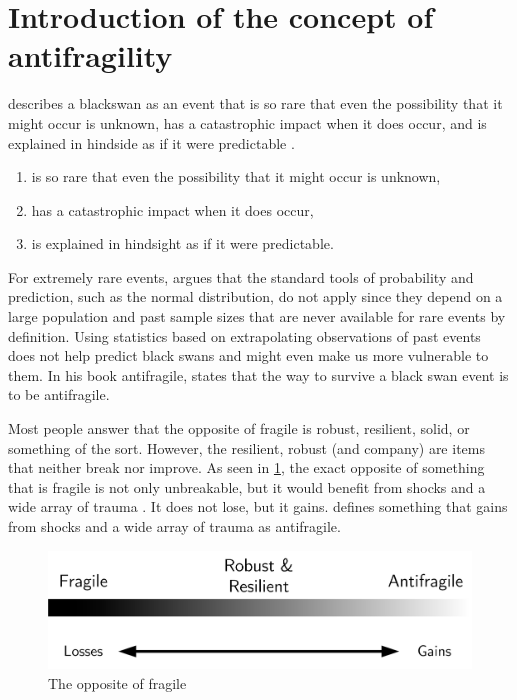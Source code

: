 \section{Introduction of the concept of antifragility}
\label{sec:introantifragility}
\textcite{Taleb2008} describes a \gls{blackswan} as an event that is so rare that even the possibility that it might occur is unknown, has a catastrophic impact when it does occur, and is explained in hindside as if it were predictable \parencite[p.~4]{Taleb2012}.
\begin{enumerate}
	\item{is so rare that even the possibility that it might occur is unknown,}
	\item{has a catastrophic impact when it does occur,}
	\item{is explained in hindsight as if it were predictable.}
\end{enumerate}
For extremely rare events, \textcite{Taleb2008} argues that the standard tools of probability and prediction, such as the normal distribution, do not apply since they depend on a large population and past sample sizes that are never available for rare events by definition. Using statistics based on extrapolating observations of past events does not help predict black swans and might even make us more vulnerable to them. In his book \Gls{antifragile}, \textcite{Taleb2012} states that the way to survive a black swan event is to be \gls{antifragile}.

Most people answer that the opposite of \gls{fragile} is \gls{robust}, \gls{resilient}, solid, or something of the sort. However, the \gls{resilient}, \gls{robust} (and company) are items that neither break nor improve. As seen in \cref{fig:antifragilesimple}, the exact opposite of something that is \gls{fragile} is not only unbreakable, but it would benefit from shocks and a wide array of trauma \parencite{Taleb2012}. It does not lose, but it gains. \textcite{Taleb2012} defines something that gains from shocks and a wide array of trauma as \gls{antifragile}. 
\begin{figure}[H]
	\centering
	\includegraphics[width=0.6\linewidth]{images/antifragilesimple}
	\caption[The opposite of fragile]{The opposite of fragile}
	\label{fig:antifragilesimple}
\end{figure}
